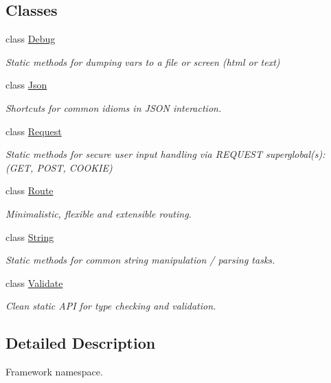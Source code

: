 \subsection*{Classes}
\begin{DoxyCompactItemize}
\item 
class \hyperlink{classBabab_1_1Simphplist_1_1Debug}{Debug}
\begin{DoxyCompactList}\small\item\em Static methods for dumping vars to a file or screen (html or text) \end{DoxyCompactList}\item 
class \hyperlink{classBabab_1_1Simphplist_1_1Json}{Json}
\begin{DoxyCompactList}\small\item\em Shortcuts for common idioms in J\+S\+O\+N interaction. \end{DoxyCompactList}\item 
class \hyperlink{classBabab_1_1Simphplist_1_1Request}{Request}
\begin{DoxyCompactList}\small\item\em Static methods for secure user input handling via R\+E\+Q\+U\+E\+S\+T superglobal(s)\+: (G\+E\+T, P\+O\+S\+T, C\+O\+O\+K\+I\+E) \end{DoxyCompactList}\item 
class \hyperlink{classBabab_1_1Simphplist_1_1Route}{Route}
\begin{DoxyCompactList}\small\item\em Minimalistic, flexible and extensible routing. \end{DoxyCompactList}\item 
class \hyperlink{classBabab_1_1Simphplist_1_1String}{String}
\begin{DoxyCompactList}\small\item\em Static methods for common string manipulation / parsing tasks. \end{DoxyCompactList}\item 
class \hyperlink{classBabab_1_1Simphplist_1_1Validate}{Validate}
\begin{DoxyCompactList}\small\item\em Clean static A\+P\+I for type checking and validation. \end{DoxyCompactList}\end{DoxyCompactItemize}


\subsection{Detailed Description}
Framework namespace. 